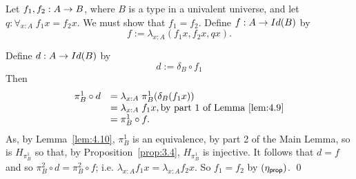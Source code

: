 Let $f_1,f_2:A\ra B$, where $B$ is a type in a univalent universe, and let 
$q:\forall_{x:A}\; f_1x=f_2x$.  We must show that $f_1=f_2$.
Define $f:A\ra Id(B)$ by
  \[ f := \lambda_{x:A}(f_1x,f_2x,qx).\]

Define $d:A\ra Id(B)$ by
  \[ d:=\delta_B\circ f_1\]
Then
  \[\be{array}{ll}
\pi^1_B\circ d &=\lambda_{x:A}\;\pi^1_B(\delta_B(f_1x))\\
              &=\lambda_{x:A}\; f_1x, \mbox{by part 1 of Lemma~\ref{lem:4.9}}\\
              &=\pi^1_B\circ f.
  \en{array}\]
As, by Lemma~\ref{lem:4.10},
 $\pi^1_B$ is an equivalence, by part 2 of the Main Lemma, so is $H_{\pi^1_B}$ so that, by Proposition~\ref{prop:3.4},
$H_{\pi^1_B}$ is injective.  It follows that  $d=f$ and so 
$\pi^2_B\circ d =\pi^2_B\circ f$; i.e. $\lambda_{x:A}f_1x =\lambda_{x:A}f_2x$.
So $f_1=f_2$ by $(\eta_{\sf prop})$.
\qed 



